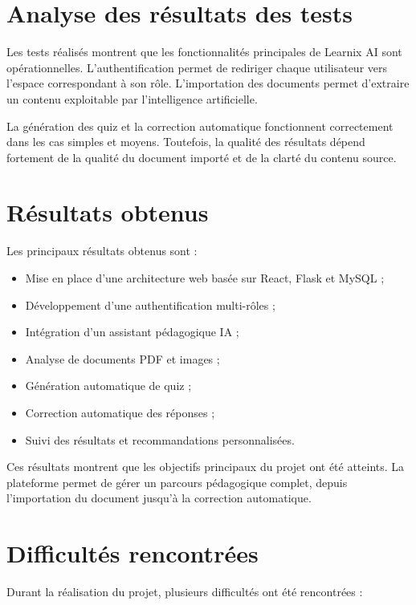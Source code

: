 \documentclass[12pt,a4paper]{report}
\begin{document}
\section{Analyse des résultats des tests}

Les tests réalisés montrent que les fonctionnalités principales de Learnix AI
sont opérationnelles. L'authentification permet de rediriger chaque utilisateur
vers l'espace correspondant à son rôle. L'importation des documents permet
d'extraire un contenu exploitable par l'intelligence artificielle.

La génération des quiz et la correction automatique fonctionnent correctement
dans les cas simples et moyens. Toutefois, la qualité des résultats dépend
fortement de la qualité du document importé et de la clarté du contenu source.

\section{Résultats obtenus}

Les principaux résultats obtenus sont :

\begin{itemize}
    \item Mise en place d'une architecture web basée sur React, Flask et MySQL ;
    \item Développement d'une authentification multi-rôles ;
    \item Intégration d'un assistant pédagogique IA ;
    \item Analyse de documents PDF et images ;
    \item Génération automatique de quiz ;
    \item Correction automatique des réponses ;
    \item Suivi des résultats et recommandations personnalisées.
\end{itemize}

Ces résultats montrent que les objectifs principaux du projet ont été atteints.
La plateforme permet de gérer un parcours pédagogique complet, depuis
l'importation du document jusqu'à la correction automatique.

\section{Difficultés rencontrées}

Durant la réalisation du projet, plusieurs difficultés ont été rencontrées :
\end{document}
